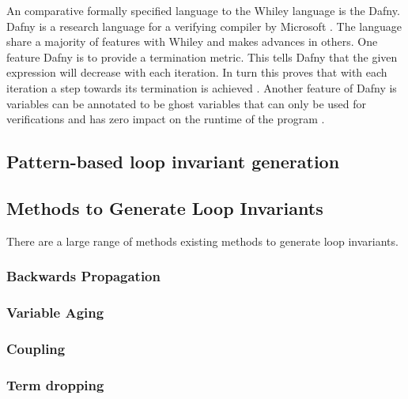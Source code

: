 An comparative formally specified language to the Whiley language is the Dafny.
Dafny is a research language for a verifying compiler by Microsoft
\cite{dafny-lang}.
The language share a majority of features with Whiley and makes advances
in others.
One feature Dafny is to provide a termination metric.
This tells Dafny that the given expression will decrease with each iteration. 
In turn this proves that with each iteration a step towards its termination is achieved \cite{dafny-started}\cite{dafny-lang}.
Another feature of Dafny is variables can be annotated to be ghost variables that
can only be used for verifications and has zero impact on the runtime of the program \cite{dafny-started}\cite{dafny-lang}.


\subsection{Pattern-based loop invariant generation}

\cite{pattern-loop-inv}

\subsection{Methods to Generate Loop Invariants}

There are a large range of methods existing methods to generate loop invariants.


\subsubsection{Backwards Propagation}

\cite{infer-postconditions}
\cite{infer-dynamic}

\subsubsection{Variable Aging}

\cite{infer-postconditions}
\cite{infer-dynamic}

\subsubsection{Coupling}

\cite{infer-postconditions}
\cite{infer-dynamic}

\subsubsection{Term dropping}

\cite{infer-postconditions}
\cite{infer-dynamic}

\cite{struct-induction}